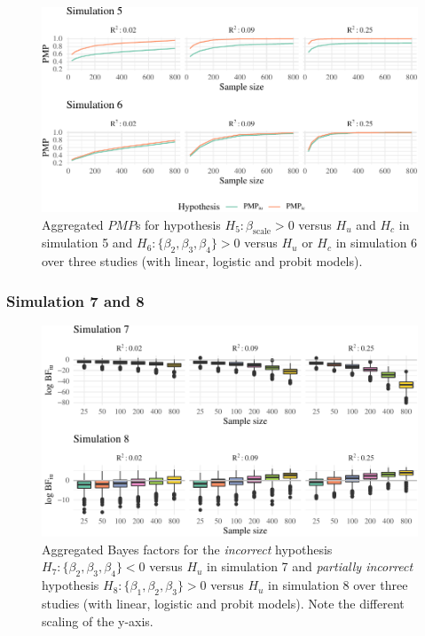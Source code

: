 \documentclass[review, 3p, authoryear]{elsarticle} %
\begin{document}
\begin{figure}
\includegraphics[width=1\linewidth]{manuscript_volker_files/figure-latex/PMP56-1} \caption{Aggregated $PMP$s for hypothesis $H_5: \beta_{\text{scale}} > 0$ versus $H_u$ and $H_c$ in simulation 5 and $H_6: \{\beta_2, \beta_3, \beta_4\} > 0$ versus $H_u$ or $H_c$ in simulation 6 over three studies (with linear, logistic and probit models).}\label{fig:PMP56}
\end{figure}

\hypertarget{simulation-7-and-8}{%
\subsubsection{Simulation 7 and 8}\label{simulation-7-and-8}}

\begin{figure}
\includegraphics[width=1\linewidth]{manuscript_volker_files/figure-latex/BF78-1} \caption{Aggregated Bayes factors for the \textit{incorrect} hypothesis $H_7: \{\beta_2, \beta_3, \beta_4\} < 0$ versus $H_u$ in simulation 7 and \textit{partially incorrect} hypothesis $H_8: \{\beta_1, \beta_2, \beta_3\} > 0$ versus $H_u$ in simulation 8 over three studies (with linear, logistic and probit models). Note the different scaling of the y-axis.}\label{fig:BF78}
\end{figure}
\end{document}
